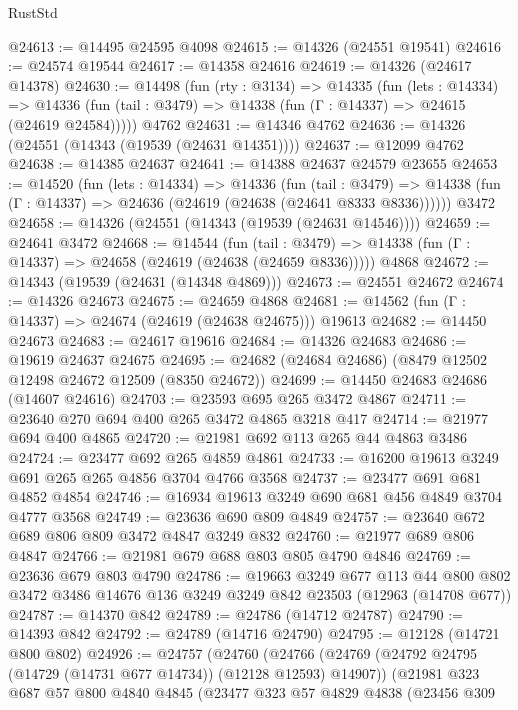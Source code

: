 \begin{lexlean}{RustStd}
\begin{coremodule}
@24613 := @14495 @24595 @4098
@24615 := @14326 (@24551 @19541)
@24616 := @24574 @19544
@24617 := @14358 @24616
@24619 := @14326 (@24617 @14378)
@24630 := @14498
    (fun (rty : @3134) =>
    @14335
      (fun (lets : @14334) =>
      @14336 (fun (tail : @3479) => @14338 (fun (Γ : @14337) => @24615 (@24619 @24584)))))
    @4762
@24631 := @14346 @4762
@24636 := @14326 (@24551 (@14343 (@19539 (@24631 @14351))))
@24637 := @12099 @4762
@24638 := @14385 @24637
@24641 := @14388 @24637 @24579 @23655
@24653 := @14520
    (fun (lets : @14334) =>
    @14336
      (fun (tail : @3479) =>
      @14338 (fun (Γ : @14337) => @24636 (@24619 (@24638 (@24641 @8333 @8336))))))
    @3472
@24658 := @14326 (@24551 (@14343 (@19539 (@24631 @14546))))
@24659 := @24641 @3472
@24668 := @14544
    (fun (tail : @3479) => @14338 (fun (Γ : @14337) => @24658 (@24619 (@24638 (@24659 @8336)))))
    @4868
@24672 := @14343 (@19539 (@24631 (@14348 @4869)))
@24673 := @24551 @24672
@24674 := @14326 @24673
@24675 := @24659 @4868
@24681 := @14562 (fun (Γ : @14337) => @24674 (@24619 (@24638 @24675))) @19613
@24682 := @14450 @24673
@24683 := @24617 @19616
@24684 := @14326 @24683
@24686 := @19619 @24637 @24675
@24695 := @24682 (@24684 @24686) (@8479 @12502 @12498 @24672 @12509 (@8350 @24672))
@24699 := @14450 @24683 @24686 (@14607 @24616)
@24703 := @23593 @695 @265 @3472 @4867
@24711 := @23640 @270 @694 @400 @265 @3472 @4865 @3218 @417
@24714 := @21977 @694 @400 @4865
@24720 := @21981 @692 @113 @265 @44 @4863 @3486
@24724 := @23477 @692 @265 @4859 @4861
@24733 := @16200 @19613 @3249 @691 @265 @265 @4856 @3704 @4766 @3568
@24737 := @23477 @691 @681 @4852 @4854
@24746 := @16934 @19613 @3249 @690 @681 @456 @4849 @3704 @4777 @3568
@24749 := @23636 @690 @809 @4849
@24757 := @23640 @672 @689 @806 @809 @3472 @4847 @3249 @832
@24760 := @21977 @689 @806 @4847
@24766 := @21981 @679 @688 @803 @805 @4790 @4846
@24769 := @23636 @679 @803 @4790
@24786 := @19663
    @3249
    @677
    @113
    @44
    @800
    @802
    @3472
    @3486
    @14676
    @136
    @3249
    @3249
    @842
    @23503
    (@12963 (@14708 @677))
@24787 := @14370 @842
@24789 := @24786 (@14712 @24787)
@24790 := @14393 @842
@24792 := @24789 (@14716 @24790)
@24795 := @12128 (@14721 @800 @802)
@24926 := @24757
    (@24760
      (@24766
        (@24769 (@24792 @24795 (@14729 (@14731 @677 @14734)) (@12128 @12593) @14907))
        (@21981
          @323
          @687
          @57
          @800
          @4840
          @4845
          (@23477
            @323
            @57
            @4829
            @4838
            (@23456
              @309

\end{coremodule}
\end{lexlean}
